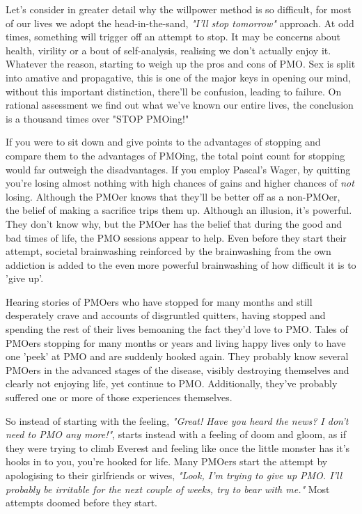\documentclass[easypeasy.tex]{subfiles}
\begin{document}
Let's consider in greater detail why the willpower method is so difficult, for most of our lives we adopt the head-in-the-sand, \textit{"I'll stop tomorrow"} approach. At odd times, something will trigger off an attempt to stop. It may be concerns about health, virility or a bout of self-analysis, realising we don't actually enjoy it. Whatever the reason, starting to weigh up the pros and cons of PMO. Sex is split into amative and propagative, this is one of the major keys in opening our mind, without this important distinction, there'll be confusion, leading to failure. On rational assessment we find out what we've known our entire lives, the conclusion is a thousand times over "STOP PMOing!"

If you were to sit down and give points to the advantages of stopping and compare them to the advantages of PMOing, the total point count for stopping would far outweigh the disadvantages. If you employ Pascal's Wager, by quitting you're losing almost nothing with high chances of gains and higher chances of \textit{not} losing. Although the PMOer knows that they'll be better off as a non-PMOer, the belief of making a sacrifice trips them up. Although an illusion, it's powerful. They don't know why, but the PMOer has the belief that during the good and bad times of life, the PMO sessions appear to help. Even before they start their attempt, societal brainwashing reinforced by the brainwashing from the own addiction is added to the even more powerful brainwashing of how difficult it is to 'give up'.

Hearing stories of PMOers who have stopped for many months and still desperately crave and accounts of disgruntled quitters, having stopped and spending the rest of their lives bemoaning the fact they'd love to PMO. Tales of PMOers stopping for many months or years and living happy lives only to have one 'peek' at PMO and are suddenly hooked again. They probably know several PMOers in the advanced stages of the disease, visibly destroying themselves and clearly not enjoying life, yet continue to PMO. Additionally, they've probably suffered one or more of those experiences themselves.

So instead of starting with the feeling, \textit{"Great! Have you heard the news? I don't need to PMO any more!"}, starts instead with a feeling of doom and gloom, as if they were trying to climb Everest and feeling like once the little monster has it's hooks in to you, you're hooked for life. Many PMOers start the attempt by apologising to their girlfriends or wives, \textit{"Look, I'm trying to give up PMO. I'll probably be irritable for the next couple of weeks, try to bear with me."} Most attempts doomed before they start.
\end{document}
